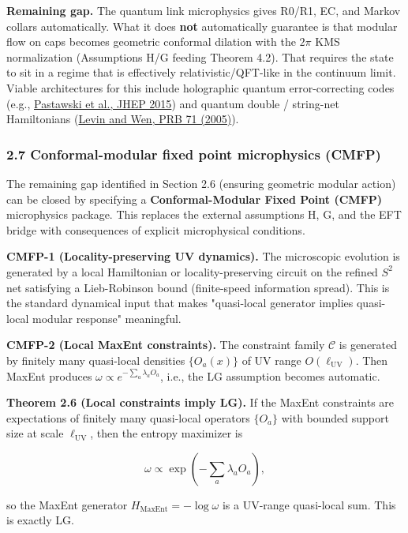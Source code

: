 \textbf{Remaining gap.} The quantum link microphysics gives R0/R1, EC, and Markov collars automatically. What it does \textbf{not} automatically guarantee is that modular flow on caps becomes geometric conformal dilation with the \(2\pi\) KMS normalization (Assumptions H/G feeding Theorem 4.2). That requires the state to sit in a regime that is effectively relativistic/QFT-like in the continuum limit. Viable architectures for this include holographic quantum error-correcting codes (e.g., \href{https://arxiv.org/abs/1503.06237}{Pastawski et al., JHEP 2015}) and quantum double / string-net Hamiltonians (\href{https://link.aps.org/doi/10.1103/PhysRevB.71.045110}{Levin and Wen, PRB 71 (2005)}).

\subsubsection{2.7 Conformal-modular fixed point microphysics (CMFP)}\label{27-conformal-modular-fixed-point-microphysics-cmfp}

The remaining gap identified in Section 2.6 (ensuring geometric modular action) can be closed by specifying a \textbf{Conformal-Modular Fixed Point (CMFP)} microphysics package. This replaces the external assumptions H, G, and the EFT bridge with consequences of explicit microphysical conditions.

\textbf{CMFP-1 (Locality-preserving UV dynamics).} The microscopic evolution is generated by a local Hamiltonian or locality-preserving circuit on the refined \(S^2\) net satisfying a Lieb-Robinson bound (finite-speed information spread). This is the standard dynamical input that makes "quasi-local generator implies quasi-local modular response" meaningful.

\textbf{CMFP-2 (Local MaxEnt constraints).} The constraint family \(\mathcal{C}\) is generated by finitely many quasi-local densities \(\{O_a(x)\}\) of UV range \(O(\ell_{\mathrm{UV}})\). Then MaxEnt produces \(\omega \propto e^{-\sum_a \lambda_a O_a}\), i.e., the LG assumption becomes automatic.

\textbf{Theorem 2.6 (Local constraints imply LG).} If the MaxEnt constraints are expectations of finitely many quasi-local operators \(\{O_a\}\) with bounded support size at scale \(\ell_{\mathrm{UV}}\), then the entropy maximizer is

\[
\omega \propto \exp\left(-\sum_a \lambda_a O_a\right),
\]

so the MaxEnt generator \(H_{\mathrm{MaxEnt}} = -\log \omega\) is a UV-range quasi-local sum. This is exactly LG.

